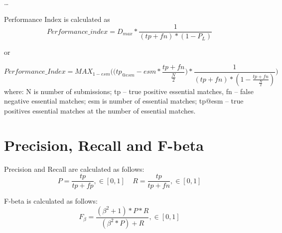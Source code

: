 \lipsum[1-4]

\ldots

Performance Index is calculated as 
\[Performance\_index=D_{max}*\frac{1}{(tp+fn)*(1-P_L)}\] 
\begin{center}
	\centering or 
\end{center} 
\[Performance\_Index=MAX_{1-esm}\Bigg(\Big(tp_{@esm}-esm*\frac{tp+fn}{\frac{N}{2}}\Big)*
					\frac{1}{(tp+fn)*(1-\frac{tp+fn}{\frac{N}{2}})}\Bigg)\]
where: N is number of submissions; tp – true positive essential matches, fn – false negative essential matches; esm is number of essential matches; tp@esm – true positives essential matches at the number of essential matches.

\section{Precision, Recall and F-beta}\label{sec:PRF1}

Precision and Recall are calculated as follows: 
\[P = \frac{tp}{tp+fp}, \in [0,1] \ \ \ \ \ R = \frac{tp}{tp+fn}, \in [0,1] \]

F-beta is calculated as follows: 
\[F_\beta = \frac{(\beta^2 + 1) * P * R}{(\beta^2 * P) + R}, \in [0,1]\]